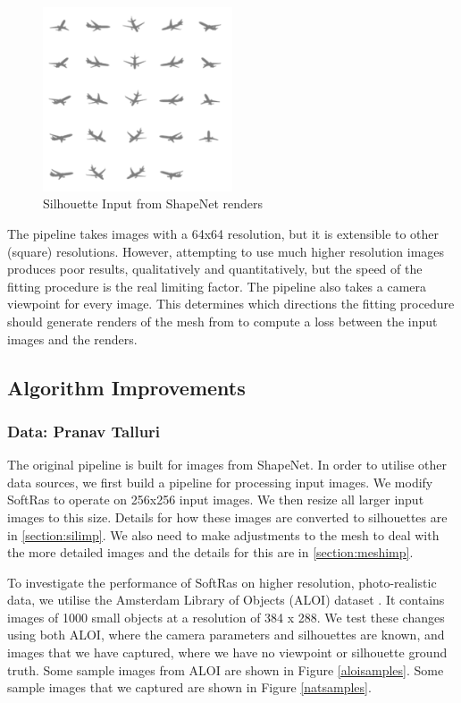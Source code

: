 \documentclass{article}
\begin{document}
\begin{figure}[h!]
  \centering
  \includegraphics[width=0.5\textwidth]{images/shapenetinput.png}
  \caption{Silhouette Input from ShapeNet renders}
  \label{shapenetinput}
\end{figure}

The pipeline takes images with a 64x64 resolution, but it is extensible to other (square) resolutions. However, attempting to use much higher resolution images produces poor results, qualitatively and quantitatively, but the speed of the fitting procedure is the real limiting factor. The pipeline also takes a camera viewpoint for every image. This determines which directions the fitting procedure should generate renders of the mesh from to compute a loss between the input images and the renders.

\subsection{Algorithm Improvements}
\subsubsection{Data: Pranav Talluri}
The original pipeline is built for images from ShapeNet. In order to utilise other data sources, we first build a pipeline for processing input images. We modify SoftRas to operate on 256x256 input images. We then resize all larger input images to this size. Details for how these images are converted to silhouettes are in \ref{section:silimp}. We also need to make adjustments to the mesh to deal with the more detailed images and the details for this are in \ref{section:meshimp}.

To investigate the performance of SoftRas on higher resolution, photo-realistic data, we utilise the Amsterdam Library of Objects (ALOI) dataset \parencite{aloi}. It contains images of 1000 small objects at a resolution of 384 x 288. We test these changes using both ALOI, where the camera parameters and silhouettes are known, and images that we have captured, where we have no viewpoint or silhouette ground truth. Some sample images from ALOI are shown in Figure \ref{aloisamples}. Some sample images that we captured are shown in Figure \ref{natsamples}.
\end{document}
